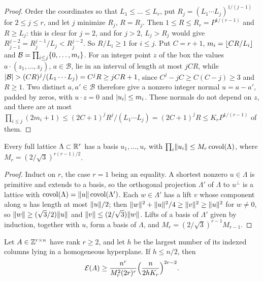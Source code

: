 \begin{proof}
Order the coordinates so that $L_1\le\dots\le L_r$, put $R_j=(L_1\cdots L_j)^{1/(j-1)}$ for $2\le j\le r$, and
let $j$ minimize $R_j$, $R=R_j$. Then $1\le R\le R_r=P^{1/(r-1)}$ and $R\ge L_j$: this is clear for $j=2$, and
for $j>2$, $L_j>R_j$ would give $R_{j-1}^{j-2}=R_j^{j-1}/L_j<R_j^{j-2}$. So $R/L_i\ge1$ for $i\le j$. Put
$C=r+1$, $m_i=\lfloor CR/L_i\rfloor$ and $\mathcal B=\prod_{i\le j}\{0,\dots,m_i\}$. For an integer point $z$ of the box
the values $a\cdot(z_1,\dots,z_j)$, $a\in\mathcal B$, lie in an interval of length at most $jCR$, while
$\lvert\mathcal B\rvert>(CR)^j/(L_1\cdots L_j)=C^jR\ge jCR+1$, since $C^j-jC\ge C(C-j)\ge3$ and $R\ge1$. Two distinct
$a,a'\in\mathcal B$ therefore give a nonzero integer normal $u=a-a'$, padded by zeros, with $u\cdot z=0$ and
$\lvert u_i\rvert\le m_i$. These normals do not depend on $z$, and there are at most
$\prod_{i\le j}(2m_i+1)\le(2C+1)^jR^j/(L_1\cdots L_j)=(2C+1)^jR\le K_rP^{1/(r-1)}$ of them.
\end{proof}

\begin{lemma}\label{spn:lem:gramshort}
Every full lattice $\Lambda\subset\mathbb{R}^r$ has a basis $u_1,\dots,u_r$ with
$\prod_i\lVert u_i\rVert\le M_r\operatorname{covol}(\Lambda)$, where $M_r=(2/\sqrt3)^{r(r-1)/2}$.
\end{lemma}

\begin{proof}
Induct on $r$, the case $r=1$ being an equality. A shortest nonzero $u\in\Lambda$ is primitive and extends to a
basis, so the orthogonal projection $\Lambda'$ of $\Lambda$ to $u^\perp$ is a lattice with
$\operatorname{covol}(\Lambda)=\lVert u\rVert\operatorname{covol}(\Lambda')$. Each $w\in\Lambda'$ has a lift $v$ whose
component along $u$ has length at most $\lVert u\rVert/2$; then $\lVert w\rVert^2+\lVert u\rVert^2/4\ge\lVert v\rVert^2\ge\lVert u\rVert^2$ for
$w\ne0$, so $\lVert w\rVert\ge(\sqrt3/2)\lVert u\rVert$ and $\lVert v\rVert\le(2/\sqrt3)\lVert w\rVert$. Lifts of a basis of $\Lambda'$ given by
induction, together with $u$, form a basis of $\Lambda$, and $M_r=(2/\sqrt3)^{r-1}M_{r-1}$.
\end{proof}

\begin{theorem}\label{spn:thm:gramrobust}
Let $A\in\mathbb{Z}^{r\times n}$ have rank $r\ge2$, and let $h$ be the largest number of its indexed columns lying in a
homogeneous hyperplane. If $h\le n/2$, then
\begin{equation}\label{spn:eq:gramrobust}
 \mathcal E(A)\ge\frac{n^r}{M_r^2(2r)^r}\Bigl(\frac n{2hK_r}\Bigr)^{2r-2}.
\end{equation}
\end{theorem}

